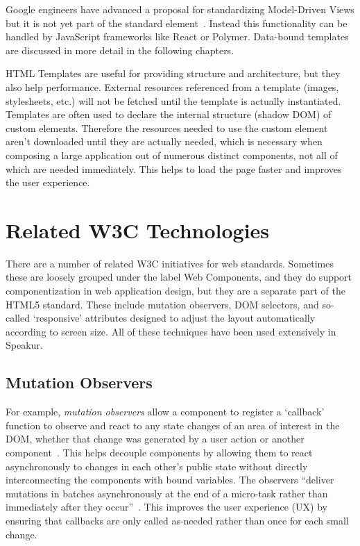 Google engineers have advanced a proposal for standardizing 
Model-Driven Views
but it is not yet part of the standard  element~\cite{googledevelopers2014}.
Instead this functionality can be handled by JavaScript frameworks like React or Polymer.
Data-bound templates are discussed in more detail in the following chapters.

HTML Templates are useful for providing structure and architecture, but they also help performance. 
External resources referenced from a template (images, style\-sheets, etc.) will not be fetched until the template is actually instantiated.
Templates are often used to declare the internal structure (shadow DOM) of custom elements. 
Therefore the resources needed to use the custom element aren't downloaded until they are actually needed, which is necessary when composing a large application out of numerous distinct components, 
not all of which are needed immediately.
This helps to load the page faster and improves the user experience.

\section{Related W3C Technologies}
There are a number of related W3C initiatives for web standards. 
Sometimes these are loosely grouped under the label Web Components,
and they do support componentization in web application design, 
but they are a separate part of the HTML5 standard.
These include mutation observers, 
DOM selectors, 
and so-called `responsive' attributes designed to adjust the layout automatically according to screen size.
All of these techniques have been used extensively in Speakur.

\subsection{Mutation Observers}
\label{sec:bgmutation}
For example, \textit{mutation observers}
allow a component to register a `callback' function to observe and react to any state changes of an area of interest in the DOM, 
whether that change was generated by a user action or another 
component~\cite{w3ccontributors2014}.
This helps decouple components by allowing them to react asynchronously to changes in each other's public state without directly interconnecting the components with bound variables.
The observers ``deliver mutations in batches asynchronously at the end of a micro-task rather than immediately after they occur''~\cite{addyosmani2014}.
This improves the user experience (UX) by ensuring that callbacks are only called as-needed rather than once for each small change.

